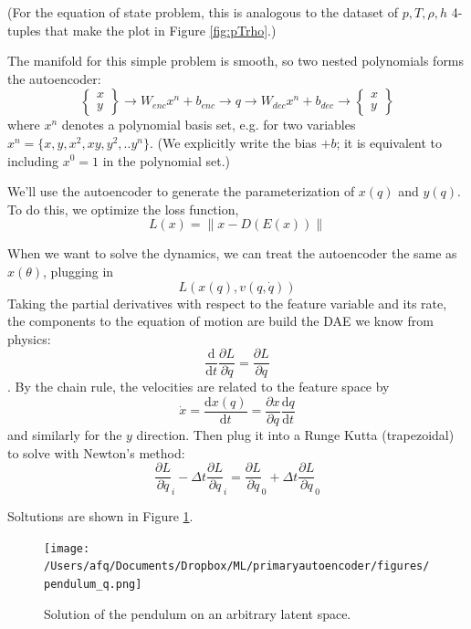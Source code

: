 \documentclass[]{article}
\begin{document}
(For the equation of state problem, this is analogous to the dataset
of $p,T,\rho,h$ 4-tuples that make the plot in Figure \ref{fig:pTrho}.)

The manifold for this simple problem is smooth, so two nested
polynomials forms the autoencoder:
\[\left\{\begin{array}{c} x\\y\end{array}\right\}
\rightarrow W_{enc} x^n +b_{enc}\rightarrow q \rightarrow W_{dec} x^n +b_{dec}\rightarrow 
\left\{\begin{array}{c} x\\y\end{array}\right\}\]
where $x^n$ denotes a polynomial basis set, e.g. for two variables $x^n=\{x,y,x^2,xy,y^2,..y^n\}$.
(We explicitly write the bias \(+b\); it is equivalent to including
\(x^0=1\) in the polynomial set.) 

We'll use the autoencoder to generate the parameterization of \(x(q)\)
and \(y(q)\). To do this, we optimize the loss function,
\begin{equation}
L(x) = \left\| x-D(E(x)) \right\|
\end{equation}

When we want to solve the dynamics, we can treat the autoencoder the
same as \(x(\theta)\), plugging in
\[L(x(q),v(q,\dot{q}))\]
Taking the partial derivatives with respect to the feature variable and
its rate, the components to the equation of motion are build the DAE we know from physics:
\[\frac{\mathrm{d}}{\mathrm{d}t}\frac{\partial L}{\partial \dot{q}} = \frac{\partial L}{\partial q}\].
By the chain rule, the velocities are related to the
feature space by
\begin{equation}
\dot{x} = \frac{\mathrm{d}x(q)}{\mathrm{d}t} = \frac{\partial x}{\partial q}\frac{\mathrm{d}q}{\mathrm{d}t}
\end{equation}
and similarly for the \(y\) direction.
Then plug it into a Runge Kutta (trapezoidal) to solve with Newton's
method:
\[\frac{\partial L}{\partial \dot{q}}_i - \Delta t \frac{\partial L}{\partial q}_i = \frac{\partial L}{\partial \dot{q}}_0 + \Delta t \frac{\partial L}{\partial q}_0\]

Soltutions are shown in Figure \ref{fig:pendulum}.
\begin{figure}
\centering
\texttt{[image: /Users/afq/Documents/Dropbox/ML/primaryautoencoder/figures/pendulum\_q.png]}
\caption{\label{fig:pendulum}Solution of the pendulum on an arbitrary latent space.}
\end{figure}
\end{document}
